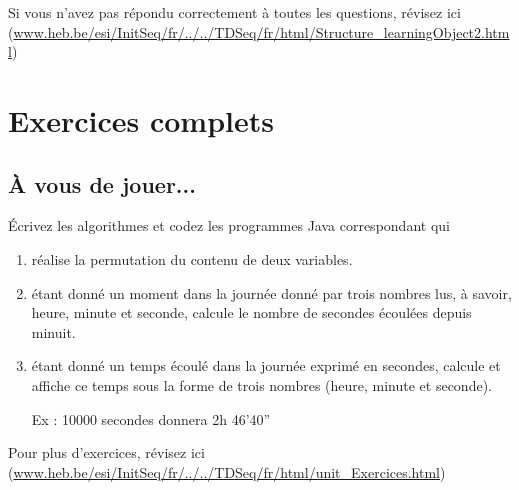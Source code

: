 \documentclass[11pt,a4paper]{article}
\begin{document}
            \par
        Si vous n'avez pas r\'epondu correctement \`a toutes les questions, 
        r\'evisez ici (\url{www.heb.be/esi/InitSeq/fr/../../TDSeq/fr/html/Structure\_learningObject2.html})
            \par
        \section{Exercices complets}\subsection{\`A vous de jouer...}
        \'Ecrivez les algorithmes et codez les programmes Java correspondant qui 
          
					\begin{enumerate}
				
			\item r\'ealise la permutation du contenu de deux variables.
			\item \'etant donn\'e un moment dans la journ\'ee donn\'e par trois nombres lus, \`a savoir, heure, minute et seconde, calcule le nombre de secondes \'ecoul\'ees depuis minuit.
			\item \'etant donn\'e un temps \'ecoul\'e dans la journ\'ee exprim\'e en secondes, calcule et affiche ce temps sous la forme de trois nombres (heure, minute et seconde). \par
				
            Ex : 10000 secondes donnera 2h 46'40”
					\end{enumerate}
				
            \par
        Pour plus d'exercices, 
        r\'evisez ici (\url{www.heb.be/esi/InitSeq/fr/../../TDSeq/fr/html/unit\_Exercices.html})
            \par
        
				
\end{document}
